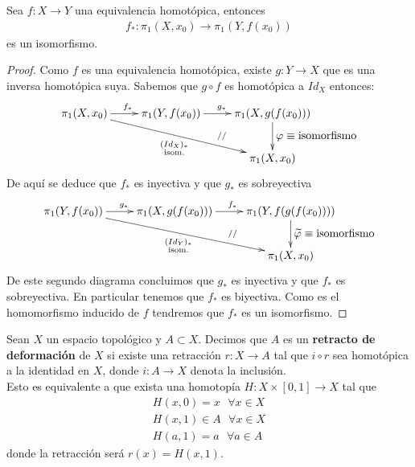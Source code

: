 \begin{teo}
    Sea $f:X\to Y$ una equivalencia homotópica, entonces
    \begin{gather*}
        f_*: \pi_1(X,x_0)\to \pi_1(Y,f(x_0))
    \end{gather*}
    es un isomorfismo.
    \begin{proof}
        Como $f$ es una equivalencia homotópica, existe $g:Y\to X$ que es una inversa homotópica suya. Sabemos que $g\circ f$ es homotópica a $Id_X$ entonces:
        \begin{gather*}
            \xymatrix{ %
            \pi_1(X,x_0) \ar[r]^{f_*} \ar[drr]_{\overset{\scriptstyle(Id_X)_*}{\text{isom.}}} & \pi_1(Y,f(x_0)) \ar[r]^{g_*} & \pi_1(X,g(f(x_0))) \ar[d]^{\displaystyle \varphi \equiv \text{isomorfismo}}\\
            && \pi_1(X,x_0)
            \ar@{}[lu]|{//}
            }
        \end{gather*}
        De aquí se deduce que $f_*$ es inyectiva y que $g_*$ es sobreyectiva
        \begin{gather*}
            \xymatrix{ %
            \pi_1(Y,f(x_0)) \ar[r]^{g_*} \ar[drr]_{\overset{\scriptstyle(Id_Y)_*}{\text{isom.}}} & \pi_1(X,g(f(x_0))) \ar[r]^{f_*} & \pi_1(Y, f(g(f(x_0)))) \ar[d]^{\displaystyle \tilde{\varphi} \equiv \text{isomorfismo}}\\
            && \pi_1(X,x_0)
            \ar@{}[lu]|{//}
            }
        \end{gather*}
        De este segundo diagrama concluimos que $g_*$ es inyectiva y que $f_*$ es sobreyectiva. En particular tenemos que $f_*$ es biyectiva. Como es el homomorfismo inducido de $f$ tendremos que $f_*$ es un isomorfismo.
    \end{proof}
\end{teo}

\begin{definicion}
    Sean $X$ un espacio topológico y $A\subset X$. Decimos que $A$ es un \textbf{retracto de deformación} de $X$ si existe una retracción $r:X\to A$ tal que $i\circ r$ sea homotópica a la identidad en $X$, donde $i: A \to X$ denota la inclusión.\\

    Esto es equivalente a que exista una homotopía $H:X\times[0,1]\to X$ tal que 
    \begin{gather*}
        H(x,0) = x \ \ \ \forall x \in X\\
        H(x,1) \in A \ \ \ \forall x \in X\\
        H(a,1) = a \ \ \ \forall a\in A
    \end{gather*}
    donde la retracción será $r(x)=H(x,1)$.
\end{definicion}

